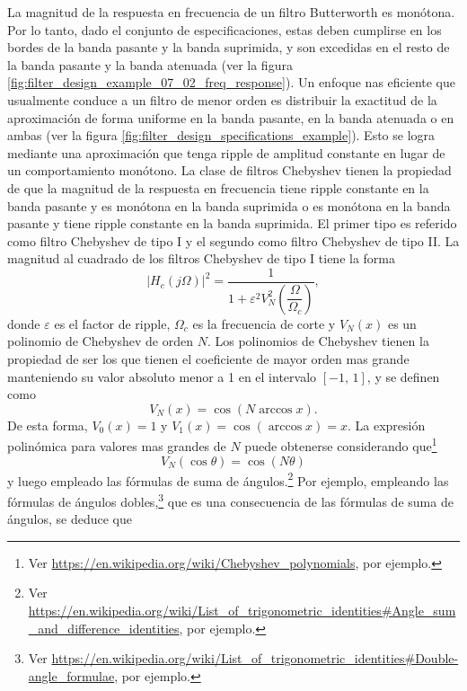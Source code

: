 \documentclass[a4paper]{report}
\begin{document}
La magnitud de la respuesta en frecuencia de un filtro Butterworth es monótona. Por lo tanto, dado el conjunto de especificaciones, estas deben cumplirse en los bordes de la banda pasante y la banda suprimida, y son excedidas en el resto de la banda pasante y la banda atenuada (ver la figura \ref{fig:filter_design_example_07_02_freq_response}). Un enfoque nas eficiente que usualmente conduce a un filtro de menor orden es distribuir la exactitud de la aproximación de forma uniforme en la banda pasante, en la banda atenuada o en ambas (ver la figura \ref{fig:filter_design_specifications_example}). Esto se logra mediante una aproximación que tenga ripple de amplitud constante en lugar de un comportamiento monótono. La clase de filtros Chebyshev tienen la propiedad de que la magnitud de la respuesta en frecuencia tiene ripple constante en la banda pasante y es monótona en la banda suprimida o es monótona en la banda pasante y tiene ripple constante en la banda suprimida. El primer tipo es referido como filtro Chebyshev de tipo I y el segundo como filtro Chebyshev de tipo II. La magnitud al cuadrado de los filtros Chebyshev de tipo I tiene la forma 
\begin{equation}\label{eq:continuous_filters_chebyshev_squared_magnitude}
 |H_c(j\Omega)|^2=\dfrac{1}{1+\varepsilon^2V^2_N\left(\dfrac{\Omega}{\Omega_c}\right)},
\end{equation}
donde \(\varepsilon\) es el factor de ripple, \(\Omega_c\) es la frecuencia de corte y \(V_N(x)\) es un polinomio de Chebyshev de orden \(N\). Los polinomios de Chebyshev tienen la propiedad de ser los que tienen el coeficiente de mayor orden mas grande manteniendo su valor absoluto menor a 1 en el intervalo \([-1,\,1]\), y se definen como
\begin{equation}\label{eq:chebyshev_polynomials_definition_x}
 V_N(x)=\cos(N\arccos x).
\end{equation}
De esta forma, \(V_0(x)=1\) y \(V_1(x)=\cos(\arccos x)=x\). La expresión polinómica para valores mas grandes de \(N\) puede obtenerse considerando que\footnote{Ver \url{https://en.wikipedia.org/wiki/Chebyshev_polynomials}, por ejemplo.}
\begin{equation}\label{eq:chebyshev_polynomials_definition_cos}
  V_N(\cos\theta)=\cos(N\theta)
\end{equation}
y luego empleado las fórmulas de suma de ángulos.\footnote{Ver \url{https://en.wikipedia.org/wiki/List_of_trigonometric_identities\#Angle_sum_and_difference_identities}, por ejemplo.} Por ejemplo, empleando las fórmulas de ángulos dobles,\footnote{Ver \url{https://en.wikipedia.org/wiki/List_of_trigonometric_identities\#Double-angle_formulae}, por ejemplo.} que es una consecuencia de las fórmulas de suma de ángulos, se deduce que
\end{document}
